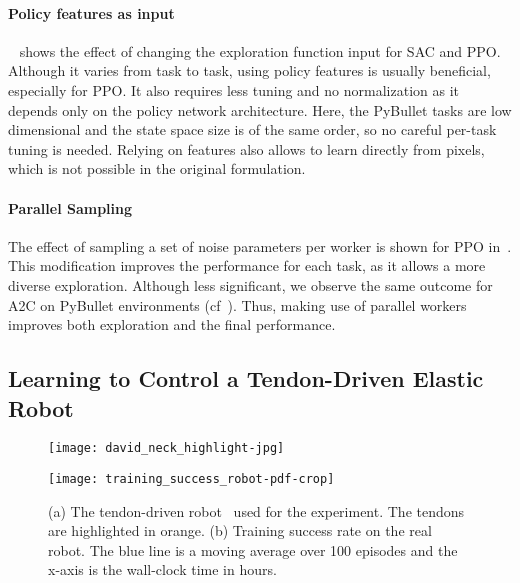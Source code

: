 \documentclass{article}
\newcommand{\aac}{\textsc{A2C}\xspace}
\newcommand{\ppo}{\textsc{PPO}\xspace}
\newcommand{\sac}{\textsc{SAC}\xspace}
\begin{document}
\paragraph{Policy features as input}

~ shows the effect of changing the exploration function input for \sac and \ppo. Although it varies from task to task, using policy features is usually beneficial, especially for \ppo. It also requires less tuning and no normalization as it depends only on the policy network architecture. Here, the PyBullet tasks are low dimensional and the state space size is of the same order, so no careful per-task tuning is needed. Relying on features also allows to learn directly from pixels, which is not possible in the original formulation.



\paragraph{Parallel Sampling}
The effect of sampling a set of noise parameters per worker is shown for \ppo in~. This modification improves the performance for each task, as it allows a more diverse exploration. Although less significant, we observe the same outcome for \aac on PyBullet environments (cf~). Thus, making use of parallel workers improves both exploration and the final performance.


\subsection{Learning to Control a Tendon-Driven Elastic Robot}
\label{sec:exp-real}

\begin{figure}[h]
  \begin{minipage}[t]{.5\linewidth}
    \centering\texttt{[image: david\_neck\_highlight-jpg]}
    \label{fig:david-neck}
  \end{minipage}
  \begin{minipage}[t]{.5\linewidth}
    \centering\texttt{[image: training\_success\_robot-pdf-crop]}
    \label{fig:success-rate}
  \end{minipage}
  \caption{(a) The tendon-driven robot~\citep{reinecke2016structurally} used for the experiment. The tendons are highlighted in orange. (b) Training success rate on the real robot. The blue line is a moving average over 100 episodes and the x-axis is the wall-clock time in hours.}
\end{figure}
\end{document}
